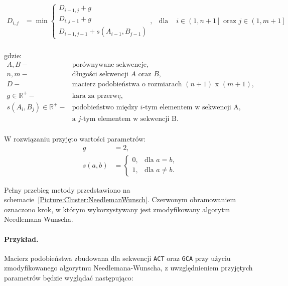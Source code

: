             \begin{equation}
                \begin{aligned}
                    D_{i,j} &= \min
                    \begin{cases}
                    D_{i - 1, j} + g \\
                    D_{i, j - 1} + g \\
                    D_{i - 1, j - 1} + s(A_{i - 1}, B_{j - 1})
                    \end{cases}, & \text{dla } & i \in \left(1, n + 1\right] \text{ oraz } j \in \left(1, m + 1\right] \\
                \end{aligned}
            \end{equation}

            gdzie:
            \begin{align*}
                A, B -& \text{porównywane sekwencje}, \\
                n, m -& \text{długości sekwencji } A \text{ oraz } B, \\
                D -& \text{macierz podobieństwa o rozmiarach } (n + 1) \text{ x } (m + 1), \\
                g \in \mathbb{R}^{+} -& \text{kara za przerwę}, \\
                s(A_i, B_j) \in \mathbb{R}^{+} -& \text{podobieństwo między  } i\text{-tym elementem w sekwencji A,} \\
                & \text{a } j \text{-tym elementem w sekwencji B}. \\
            \end{align*}

            W rozwiązaniu przyjęto wartości parametrów:
            \begin{align*}
                g &= 2, \\
                s(a, b) &= \begin{cases}
                    0, & \text{dla } a = b, \\
                    1, & \text{dla } a \neq b.
                \end{cases}
            \end{align*}

            Pełny przebieg metody przedstawiono na schemacie~\ref{Picture:Cluster:NeedlemanWunsch}. Czerwonym obramowaniem oznaczono krok, w którym wykorzystywany jest zmodyfikowany algorytm Needlemana-Wunscha.

            \paragraph{Przykład.} Macierz podobieństwa zbudowana dla sekwencji \texttt{ACT} oraz \texttt{GCA} przy użyciu zmodyfikowanego algorytmu Needlemana-Wunscha, z uwzględnieniem przyjętych parametrów będzie wyglądać następująco:

